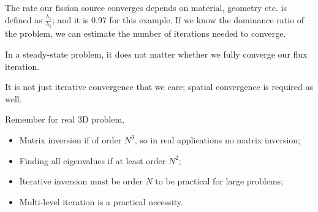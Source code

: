 \documentclass{school-22.211-notes}
\begin{document}
The rate our fission source converges depends on material, geometry etc.  is defined as $\frac{\lambda_1}{\lambda_2}$; and it is 0.97 for this example. If we know the dominance ratio of the problem, we can estimate the number of iterations needed to converge. 


In a steady-state problem, it does not matter whether we fully converge our flux iteration. 

It is not just iterative convergence that we care; spatial convergence is required as well. 

Remember for real 3D problem,
\begin{itemize}
\item Matrix inversion if of order $N^3$, so in real applications no matrix inversion;
\item Finding all eigenvalues if at least order $N^2$;
\item Iterative inversion must be order $N$ to be practical for large problems;
\item Multi-level iteration is a practical necessity. 
\end{itemize}
\end{document}

